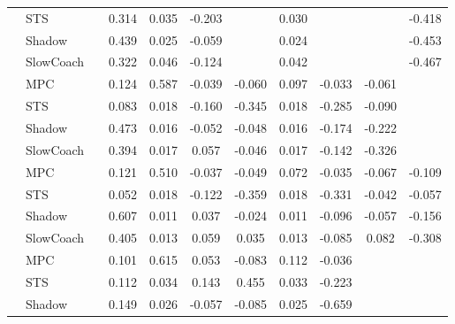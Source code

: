 \begin{tabular}{|l|l|*{9}{c|}}
                                                           & STS &       &     0.314 &     0.035 & -0.203 &     &  0.030 &      &      &   -0.418 \\
                                                           & Shadow &       &     0.439 &     0.025 & -0.059 &     &  0.024 &      &      &   -0.453 \\
                                                           & SlowCoach &       &     0.322 &     0.046 & -0.124 &     &  0.042 &      &      &   -0.467 \\
\midrule
[False, True, True, True, True, True, True, True, False] & MPC &       &     0.124 &     0.587 & -0.039 & -0.060 &  0.097 &  -0.033 &  -0.061 &       \\
                                                           & STS &       &     0.083 &     0.018 & -0.160 & -0.345 &  0.018 &  -0.285 &  -0.090 &       \\
                                                           & Shadow &       &     0.473 &     0.016 & -0.052 & -0.048 &  0.016 &  -0.174 &  -0.222 &       \\
                                                           & SlowCoach &       &     0.394 &     0.017 &  0.057 & -0.046 &  0.017 &  -0.142 &  -0.326 &       \\
\midrule
[False, True, True, True, True, True, True, True, True] & MPC &       &     0.121 &     0.510 & -0.037 & -0.049 &  0.072 &  -0.035 &  -0.067 &   -0.109 \\
                                                           & STS &       &     0.052 &     0.018 & -0.122 & -0.359 &  0.018 &  -0.331 &  -0.042 &   -0.057 \\
                                                           & Shadow &       &     0.607 &     0.011 &  0.037 & -0.024 &  0.011 &  -0.096 &  -0.057 &   -0.156 \\
                                                           & SlowCoach &       &     0.405 &     0.013 &  0.059 &  0.035 &  0.013 &  -0.085 &   0.082 &   -0.308 \\
\midrule
[False, True, True, True, True, True, True, False, False] & MPC &       &     0.101 &     0.615 &  0.053 & -0.083 &  0.112 &  -0.036 &      &       \\
                                                           & STS &       &     0.112 &     0.034 &  0.143 &  0.455 &  0.033 &  -0.223 &      &       \\
                                                           & Shadow &       &     0.149 &     0.026 & -0.057 & -0.085 &  0.025 &  -0.659 &      &       \\

\end{tabular}
